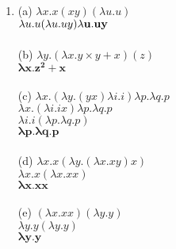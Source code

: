 \documentclass{article}
\begin{document}
\begin{enumerate}
    \item (a) $\lambda x.x(xy)(\lambda u.u)$ \\
    $\lambda u.u(\lambda u.uy) \\
    \mathbf{\lambda u.uy}$ \\ \\
    (b) $\lambda y.(\lambda x.y \times y + x)(z)$ \\
    $\mathbf{\lambda x.z^2 + x}$ \\ \\
    (c) $\lambda x.(\lambda y.(yx)\lambda i.i)\lambda p.\lambda q.p$ \\
    $\lambda x.(\lambda i.i x)\lambda p.\lambda q.p$ \\
    $\lambda i.i(\lambda p.\lambda q.p)$ \\
    $\mathbf{\lambda p.\lambda q.p}$ \\ \\
    (d) $\lambda x.x(\lambda y.(\lambda x.xy)x)$ \\
    $\lambda x.x(\lambda x.xx)$ \\
    $\mathbf{\lambda x.xx}$ \\ \\
    (e) $(\lambda x.xx)(\lambda y.y)$ \\
    $\lambda y.y(\lambda y.y)$ \\
    $\mathbf{\lambda y.y}$
\end{enumerate}
\end{document}

